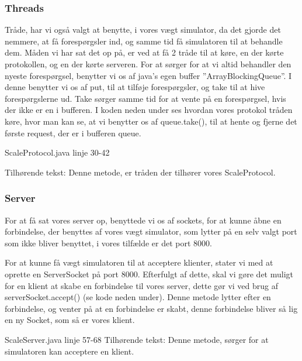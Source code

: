 \documentclass[a4paper]{article}
\begin{document}
\subsubsection{Threads} %

Tråde, har vi også valgt at benytte, i vores vægt simulator, da det gjorde det nemmere, at få forespørgsler ind, og samme tid få simulatoren til at behandle dem. Måden vi har sat det op på, er ved at få 2 tråde til at køre, en der kørte protokollen, og en der kørte serveren. For at sørger for at vi altid behandler den nyeste forespørgsel, benytter vi os af java’s egen buffer ”ArrayBlockingQueue”. I denne benytter vi os af put, til at tilføje forespørgsler, og take til at hive forespørgslerne ud. Take sørger samme tid for at vente på en forespørgsel, hvis der ikke er en i bufferen. I koden neden under ses hvordan vores protokol tråden køre, hvor man kan se, at vi benytter os af queue.take(), til at hente og fjerne det første request, der er i bufferen queue.

\begin{center}
ScaleProtocol.java linje 30-42

Tilhørende tekst: Denne metode, er tråden der tilhører vores ScaleProtocol.
\end{center}


\subsubsection{Server} %

For at få sat vores server op, benyttede vi os af sockets, for at kunne åbne en forbindelse, der benyttes af vores vægt simulator, som lytter på en selv valgt port som ikke bliver benyttet, i vores tilfælde er det port 8000.

For at kunne få vægt simulatoren til at acceptere klienter, stater vi med at oprette en ServerSocket på port 8000. Efterfulgt af dette, skal vi gøre det muligt for en klient at skabe en forbindelse til vores server, dette gør vi ved brug af serverSocket.accept() (se kode neden under). Denne metode lytter efter en forbindelse, og venter på at en forbindelse er skabt, denne forbindelse bliver så lig en ny Socket, som så er vores klient. 

\begin{center}
ScaleServer.java linje 57-68
Tilhørende tekst: Denne metode, sørger for at simulatoren kan acceptere en klient.
\end{center}
\end{document}
